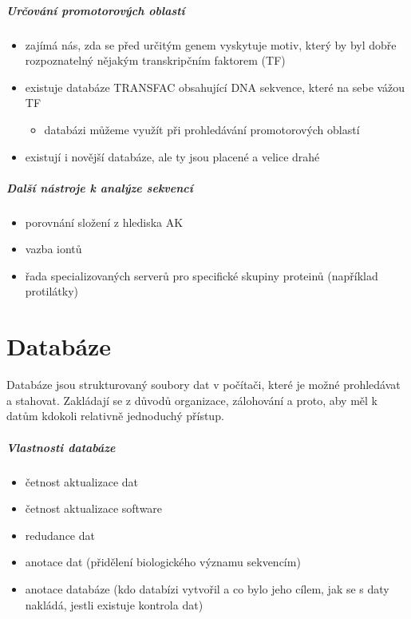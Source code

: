\documentclass[DIV=8]{scrreprt}
\begin{document}
\paragraph{Určování promotorových oblastí}
\begin{itemize}[nosep]
    \item zajímá nás, zda se před určitým genem vyskytuje motiv, který by byl dobře rozpoznatelný nějakým transkripčním faktorem (TF)
    \item existuje databáze TRANSFAC obsahující DNA sekvence, které na sebe vážou TF
\begin{itemize}[nosep]
    \item databázi můžeme využít při prohledávání promotorových oblastí
\end{itemize}

    \item existují i novější databáze, ale ty jsou placené a velice drahé
\end{itemize}



\paragraph{Další nástroje k analýze sekvencí}
\begin{itemize}[nosep]
    \item porovnání složení z hlediska AK
    \item vazba iontů
    \item řada specializovaných serverů pro specifické skupiny proteinů (například protilátky)
\end{itemize}



\chapter{Databáze} \label{Databáze}


Databáze jsou strukturovaný soubory dat v počítači, které je možné prohledávat a stahovat. Zakládají se z důvodů organizace, zálohování a proto, aby měl k datům kdokoli relativně jednoduchý přístup.

\paragraph{Vlastnosti databáze}
\begin{itemize}[nosep]
    \item četnost aktualizace dat
    \item četnost aktualizace software
    \item redudance dat
    \item anotace dat (přidělení biologického významu sekvencím)
    \item anotace databáze (kdo databízi vytvořil a co bylo jeho cílem, jak se s daty nakládá, jestli existuje kontrola dat)
\end{itemize}
\end{document}
